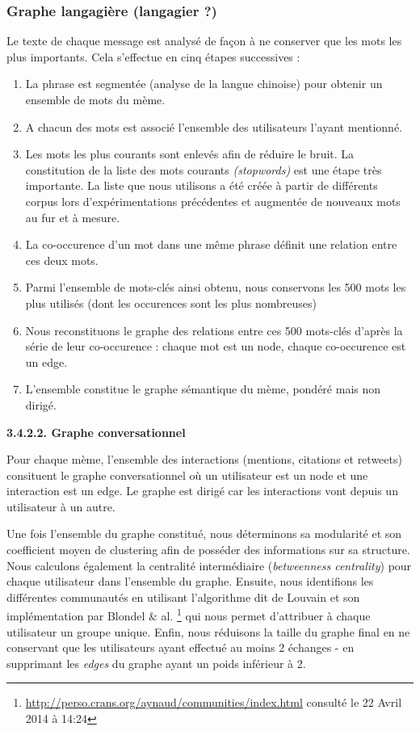 \subsubsection{Graphe langagière (langagier ?)}

Le texte de chaque message est analysé de fa\c{c}on à ne conserver
que les mots les plus importants. Cela s{\textquoteright}effectue en
cinq étapes successives : 

\begin{enumerate}
\item La phrase est segmentée (analyse de la langue chinoise) pour
obtenir un ensemble de mots du mème.
\item A chacun des mots est associé l{\textquoteright}ensemble des
utilisateurs l{\textquoteright}ayant mentionné.
\item Les mots les plus courants sont enlevés afin de réduire le
bruit. La constitution de la liste des mots courants
\textit{(stopwords) }est une étape très importante. La liste que
nous utilisons a été créée à partir de différents corpus
lors d{\textquoteright}expérimentations précédentes et
augmentée de nouveaux mots au fur et à mesure.
\item La co-occurence d{\textquoteright}un mot dans une m\^eme phrase
définit une relation entre ces deux mots.
\item Parmi l{\textquoteright}ensemble de mots-clés ainsi obtenu, nous
conservons les 500 mots les plus utilisés (dont les occurences sont
les plus nombreuses) 
\item Nous reconstituons le graphe des relations entre ces 500
mots-clés d{\textquoteright}après la série de leur co-occurence :
chaque mot est un node, chaque co-occurence est un edge.
\item L{\textquoteright}ensemble constitue le graphe sémantique du
mème, pondéré mais non dirigé.
\end{enumerate}
\textbf{3.4.2.2. Graphe conversationnel}

Pour chaque mème, l{\textquoteright}ensemble des interactions
(mentions, citations et retweets) consituent le graphe conversationnel
o\`u un utilisateur est un node et une interaction est un edge. Le
graphe est dirigé car les interactions vont depuis un utilisateur à
un autre. 

Une fois l{\textquoteright}ensemble du graphe constitué, nous
déterminons sa modularité et son coefficient moyen de clustering
afin de posséder des informations sur sa structure. Nous calculons
également la centralité intermédiaire (\textit{betweenness
centrality}) pour chaque utilisateur dans l{\textquoteright}ensemble du
graphe. Ensuite, nous identifions les différentes communautés en
utilisant l{\textquoteright}algorithme dit de Louvain et son
implémentation par Blondel \& al. \citep{Blondel2008}\footnote{
\url{http://perso.crans.org/aynaud/communities/index.html} consulté
le 22 Avril 2014 à 14:24} qui nous permet d{\textquoteright}attribuer
à chaque utilisateur un groupe unique. Enfin, nous réduisons la
taille du graphe final en ne conservant que les utilisateurs ayant
effectué au moins 2 échanges - en supprimant les \textit{edges} du
graphe ayant un poids inférieur à 2.

